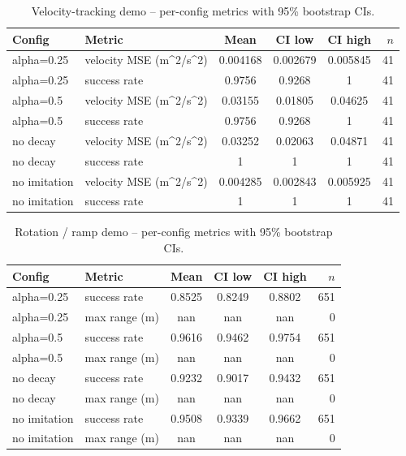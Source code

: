 \begin{table}[ht]
\centering
\caption{Velocity-tracking demo -- per-config metrics with 95\% bootstrap CIs.}
\label{tab:vel_diff}
\begin{tabular}{llcccr}
\toprule
Config & Metric & Mean & CI low & CI high & $n$ \\
\midrule
alpha=0.25 & velocity MSE (m^2/s^2) & 0.004168 & 0.002679 & 0.005845 & 41 \\
alpha=0.25 & success rate & 0.9756 & 0.9268 & 1 & 41 \\
alpha=0.5 & velocity MSE (m^2/s^2) & 0.03155 & 0.01805 & 0.04625 & 41 \\
alpha=0.5 & success rate & 0.9756 & 0.9268 & 1 & 41 \\
no decay & velocity MSE (m^2/s^2) & 0.03252 & 0.02063 & 0.04871 & 41 \\
no decay & success rate & 1 & 1 & 1 & 41 \\
no imitation & velocity MSE (m^2/s^2) & 0.004285 & 0.002843 & 0.005925 & 41 \\
no imitation & success rate & 1 & 1 & 1 & 41 \\
\bottomrule
\end{tabular}
\end{table}

\begin{table}[ht]
\centering
\caption{Rotation / ramp demo -- per-config metrics with 95\% bootstrap CIs.}
\label{tab:rotation}
\begin{tabular}{llcccr}
\toprule
Config & Metric & Mean & CI low & CI high & $n$ \\
\midrule
alpha=0.25 & success rate & 0.8525 & 0.8249 & 0.8802 & 651 \\
alpha=0.25 & max range (m) & nan & nan & nan & 0 \\
alpha=0.5 & success rate & 0.9616 & 0.9462 & 0.9754 & 651 \\
alpha=0.5 & max range (m) & nan & nan & nan & 0 \\
no decay & success rate & 0.9232 & 0.9017 & 0.9432 & 651 \\
no decay & max range (m) & nan & nan & nan & 0 \\
no imitation & success rate & 0.9508 & 0.9339 & 0.9662 & 651 \\
no imitation & max range (m) & nan & nan & nan & 0 \\
\bottomrule
\end{tabular}
\end{table}

